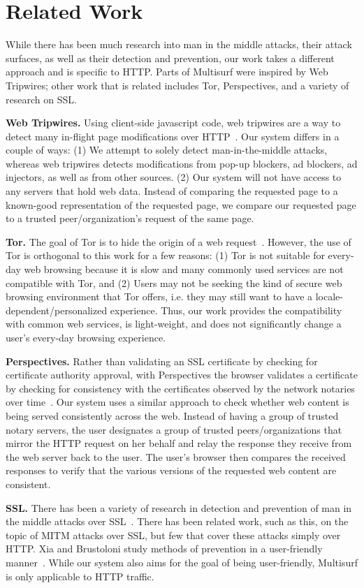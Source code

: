 \section{Related Work}
\label{sec:related}

While there has been much research into man in the middle attacks, their attack surfaces, as well as their detection and prevention, our work takes a different approach and is specific to HTTP.  Parts of Multisurf were inspired by Web Tripwires; other work that is related includes Tor, Perspectives, and a variety of research on SSL.

{\bf Web Tripwires.} Using client-side javascript code, web tripwires are a way to detect many in-flight page modifications over HTTP~\cite{reis2008detecting}.  Our system differs in a couple of ways: (1) We attempt to solely detect man-in-the-middle attacks, whereas web tripwires detects modifications from pop-up blockers, ad blockers, ad injectors, as well as from other sources. (2) Our system will not have access to any servers that hold web data.  Instead of comparing the requested page to a known-good representation of the requested page, we compare our requested page to a trusted peer/organization's request of the same page. 

{\bf Tor.} The goal of Tor is to hide the origin of a web request~\cite{dingledine2004tor}. However, the use of Tor is orthogonal to this work for a few reasons: (1) Tor is not suitable for every-day web browsing because it is slow and many commonly used services are not compatible with Tor, and (2) Users may not be seeking the kind of secure web browsing environment that Tor offers, i.e. they may still want to have a locale-dependent/personalized experience. Thus, our work provides the compatibility with common web services, is light-weight, and does not significantly change a user's every-day browsing experience.

{\bf Perspectives.} Rather than validating an SSL certificate by checking for certificate authority approval, with Perspectives the browser validates a certificate by checking for consistency with the certificates observed by the network notaries over time~\cite{wendlandt2008perspectives}. Our system uses a similar approach to check whether web content is being served consistently across the web. Instead of having a group of trusted notary servers, the user designates a group of trusted peers/organizations that mirror the HTTP request on her behalf and relay the response they receive from the web server back to the user. The user's browser then compares the received responses to verify that the various versions of the requested web content are consistent.             

{\bf SSL.} There has been a variety of research in detection and prevention of man in the middle attacks over SSL~\cite{oppliger2006ssl, callegati2009man, jia2007principle, xia2005hardening, joshi2009mitigating}. There has been related work, such as this, on the topic of MITM attacks over SSL, but few that cover these attacks simply over HTTP.  Xia and Brustoloni study methods of prevention in a user-friendly manner~\cite{xia2005hardening}.  While our system also aims for the goal of being user-friendly, Multisurf is only applicable to HTTP traffic.
